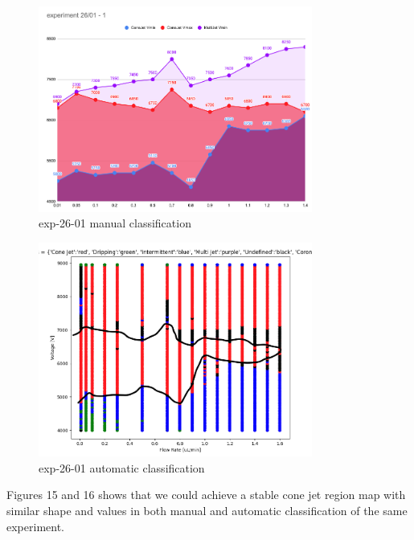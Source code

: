         \begin{multicols}{2}


            \begin{figure}[H]
                \center
                \includegraphics[width=9cm]{Figuras/report3/manual-mapping.png}
                \caption{ exp-26-01 manual classification}
            \end{figure}

            \begin{figure}[H]
                \center
                \includegraphics[width=9cm]{Figuras/report3/map4-stabilityIsland.png}
                \caption{ exp-26-01 automatic classification}
            \end{figure}

        \end{multicols}

        Figures 15 and 16 shows that we could achieve a stable cone jet region map with similar shape and values in both manual and automatic classification of the same experiment.


